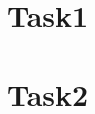 \section{Task1}
\label{sec:Task1}
\begin{comment}

\end{comment}

\section{Task2}
\label{sec:Task2}
\begin{comment}
\end{comment}